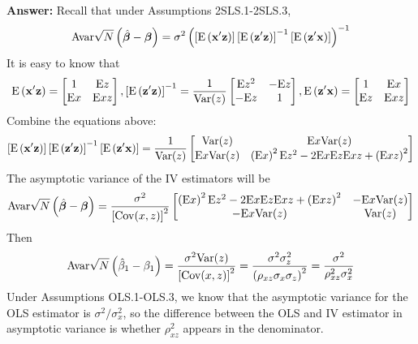 \begin{enumerate}
\begin{enumerate}
        \textbf{Answer:} Recall that under Assumptions 2SLS.1-2SLS.3,
        \[ \mathrm{Avar}\sqrt{N}\left(\hat{\bm{\beta}}-\bm{\beta}\right) = \sigma^{2}\left(\left[\mathrm{E}\left(\mathbf{x}^{\prime} \mathbf{z}\right)\right]\left[\mathrm{E}\left(\mathbf{z}^{\prime} \mathbf{z}\right)\right]^{-1} \left[\mathrm{E}\left(\mathbf{z}^{\prime} \mathbf{x}\right)\right]\right)^{-1} \]
        It is easy to know that
        \[ \mathrm{E}\left(\mathbf{x}^{\prime} \mathbf{z}\right) = \begin{bmatrix}
            1 & \mathrm{E}z \\
            \mathrm{E}x & \mathrm{E}xz
        \end{bmatrix},
        \left[\mathrm{E}\left(\mathbf{z}^{\prime} \mathbf{z}\right)\right]^{-1} = \frac{1}{\mathrm{Var}(z)} \begin{bmatrix}
            \mathrm{E}z^2 & -\mathrm{E}z \\
            -\mathrm{E}z & 1
        \end{bmatrix},
        \mathrm{E}\left(\mathbf{z}^{\prime} \mathbf{x}\right) = \begin{bmatrix}
            1 & \mathrm{E}x \\
            \mathrm{E}z & \mathrm{E}xz
        \end{bmatrix} \]
        Combine the equations above: 
        \[ \left[\mathrm{E}\left(\mathbf{x}^{\prime} \mathbf{z}\right)\right]\left[\mathrm{E}\left(\mathbf{z}^{\prime} \mathbf{z}\right)\right]^{-1} \left[\mathrm{E}\left(\mathbf{z}^{\prime} \mathbf{x}\right)\right] = \frac{1}{\mathrm{Var}(z)} \begin{bmatrix}
            \mathrm{Var}(z) & \mathrm{E}x \mathrm{Var}(z) \\
            \mathrm{E}x \mathrm{Var}(z) & \left(\mathrm{E}x\right)^2 \mathrm{E}z^2-2\mathrm{E}x\mathrm{E}z\mathrm{E}xz+\left(\mathrm{E}xz\right)^2
        \end{bmatrix}\]
        The asymptotic variance of the IV estimators will be
        \[\mathrm{Avar}\sqrt{N}\left(\hat{\bm{\beta}}-\bm{\beta}\right) = \frac{\sigma^2}{\left[\mathrm{Cov}(x,z)\right]^2} \begin{bmatrix}
            \left(\mathrm{E}x\right)^2 \mathrm{E}z^2-2\mathrm{E}x\mathrm{E}z\mathrm{E}xz+\left(\mathrm{E}xz\right)^2 & -\mathrm{E}x \mathrm{Var}(z) \\
            -\mathrm{E}x \mathrm{Var}(z) & \mathrm{Var}(z)
        \end{bmatrix}\]
        Then
        \[\mathrm{Avar}\sqrt{N}\left(\hat{\beta}_{1}-\beta_{1}\right) = \frac{\sigma^2\mathrm{Var}(z)}{\left[\mathrm{Cov}(x,z)\right]^2} = \frac{\sigma^2\sigma_z^2}{\left(\rho_{xz}\sigma_x\sigma_z\right)^2} = \frac{\sigma^2}{\rho_{xz}^2\sigma_x^2}\]
        Under Assumptions OLS.1-OLS.3, we know that the asymptotic variance for the OLS estimator is $\sigma^2/\sigma^2_x$, so the difference between the OLS and IV estimator in asymptotic variance is whether $\rho_{xz}^2$ appears in the denominator.
        

\end{enumerate}
\end{enumerate}
